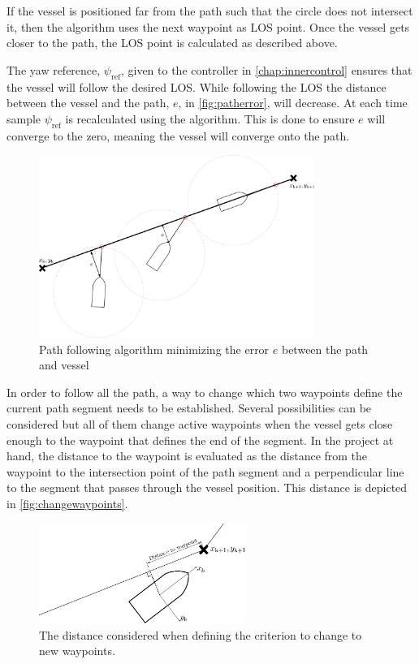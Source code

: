 If the vessel is positioned far from the path such that the circle does not intersect it, then the algorithm uses the next waypoint as LOS point. Once the vessel gets closer to the path, the LOS point is calculated as described above.

The yaw reference, $\psi_\mathrm{ref}$, given to the controller in \autoref{chap:innercontrol} ensures that the vessel will follow the desired LOS. While following the LOS the distance between the vessel and the path, $e$, in \autoref{fig:patherror}, will decrease. At each time sample $\psi_\mathrm{ref}$ is recalculated using the algorithm. This is done to ensure $e$ will converge to the zero, meaning the vessel will converge onto the path.
%
\begin{figure}[H]
	\includegraphics[width=0.8\textwidth]{figures/patherror}
	\caption{Path following algorithm minimizing the error $e$ between the path and vessel}
	\label{fig:patherror}
\end{figure}
%
In order to follow all the path, a way to change which two waypoints define the current path segment needs to be established. Several possibilities can be considered but all of them change active waypoints when the vessel gets close enough to the waypoint that defines the end of the segment. In the project at hand, the distance to the waypoint is evaluated as the distance from the waypoint to the intersection point of the path segment and a perpendicular line to the segment that passes through the vessel position. This distance is depicted in \autoref{fig:changewaypoints}.
\begin{figure}[H]
	\includegraphics[width=0.6\textwidth]{figures/LOSalgorithmdistancewp}
	\caption{The distance considered when defining the criterion to change to new waypoints.}
	\label{fig:changewaypoints}
\end{figure}
